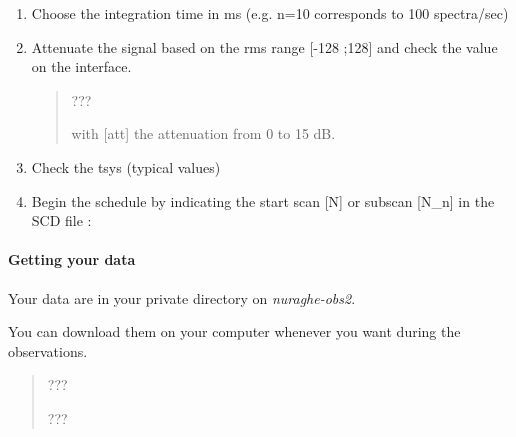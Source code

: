 \documentclass[letterpaper,10pt,english]{sphinxmanual}
\begin{document}
\begin{enumerate}
\begin{quote}
\begin{description}
\end{description}
\end{quote}

\item {} 
Choose the integration time in ms (e.g. n=10 corresponds to 100 spectra/sec)
\begin{quote}

\end{quote}

\item {} 
Attenuate the signal based on the rms range {[}-128 ;128{]} and check the value on the interface.
\begin{quote}

  ???

    with {[}att{]} the attenuation from 0 to 15 dB.
\end{quote}

\item {} 
Check the tsys (typical values)
\begin{quote}

\end{quote}

\item {} 
Begin the schedule by indicating the start scan {[}N{]} or subscan {[}N\_n{]} in the SCD file :
\begin{quote}

\end{quote}

\end{enumerate}


\paragraph{Getting your data}
\label{SpectralLine/C-band/SARDARA/get-data:getting-your-data}\label{SpectralLine/C-band/SARDARA/get-data::doc}
Your data are in your private directory on \emph{nuraghe-obs2}.

You can download them on your computer whenever you want during the observations.
\begin{quote}

  ???

 ???
\end{quote}
\end{document}
